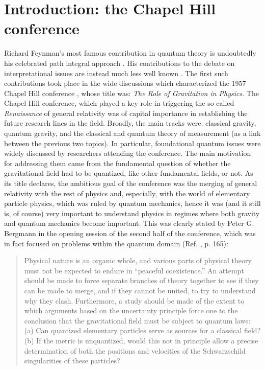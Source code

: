 \documentclass{ws-procs961x669}            %
\begin{document}
\section{Introduction: the Chapel Hill conference}\label{sec1}
Richard Feynman's most famous contribution in quantum theory is
undoubtedly his celebrated path integral approach
\cite{Feynman1948}. His contributions to the debate on
interpretational issues are instead much less well known
\cite{Zeh,noi}. The first such contributions took place in the
wide discussions which characterized the 1957 Chapel Hill
conference \cite{ChapelHill}, whose title was: \emph{The Role of
Gravitation in Physics}. The Chapel Hill conference, which played
a key role in triggering the so called \emph{Renaissance} of
general relativity \cite{BlumLalliRenn} was of capital importance
in establishing the future research lines in the field. Broadly,
the main tracks were\cite{BergmannRMP}: classical gravity, quantum
gravity, and the classical and quantum theory of measurement (as a
link between the previous two topics). In particular, foundational
quantum issues were widely discussed by researchers attending the
conference. The main motivation for addressing them came from the
fundamental question of whether the gravitational field had to be
quantized, like other fundamental fields, or not. As its title
declares, the ambitious goal of the conference was the merging of
general relativity with the rest of physics and, especially, with
the world of elementary particle physics, which was ruled by
quantum mechanics, hence it was (and it still is, of course) very
important to understand physics in regimes where both gravity and
quantum mechanics become important. This was clearly stated by
Peter G. Bergmann in the opening session of the second half of the
conference, which was in fact focused on problems within the
quantum domain (Ref. , p. 165):
%
\begin{quote}
Physical nature is an organic whole, and various parts of
physical theory must not be expected to endure in ``peaceful
coexistence.'' An attempt should be made to force separate
branches of theory together to see if they can be made to merge,
and if they cannot be united, to try to understand why they clash.
Furthermore, a study should be made of the extent to which
arguments based on the uncertainty principle force one to the
conclusion that the gravitational field must be subject to quantum
laws: (a) Can quantized elementary particles serve as sources for
a classical field? (b) If the metric is unquantized, would this
not in principle allow a precise determination of both the
positions and velocities of the Schwarzschild singularities of
these particles?
\end{quote}
\end{document}
